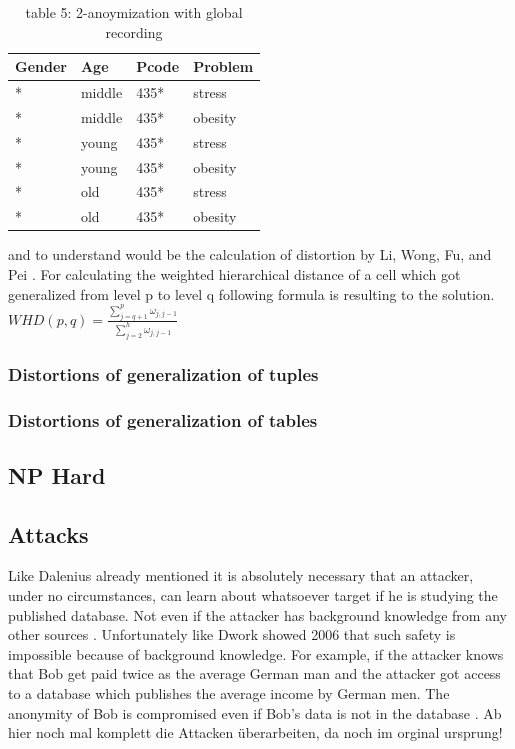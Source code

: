 \documentclass{llncs}
\begin{document}
\begin{table}[]
	\centering
	\caption{table 5: 2-anoymization with global recording}
	\label{table4}
	\begin{tabular}{@{}llll@{}}
		\toprule
		Gender & Age    & Pcode & Problem \\ \midrule
		*      & middle & 435*  & stress  \\
		*      & middle & 435*  & obesity \\
		*      & young  & 435*  & stress  \\
		*      & young  & 435*  & obesity \\
		*      & old    & 435*  & stress  \\
		*      & old    & 435*  & obesity
	\end{tabular}
\end{table} 
and to understand would be the calculation of distortion by Li, Wong, Fu, and Pei \cite{li2006achieving}. 
For calculating the weighted hierarchical distance of a cell which got generalized from level p to level q following formula is resulting to the solution.\\
$ WHD (p, q) = \frac{\sum_{j=q+1}^{p} \omega_{j,j-1}}{\sum_{j=2}^{h} \omega_{j,j-1}} $
\subsubsection{Distortions of generalization of tuples}
\subsubsection{Distortions of generalization of tables}

\subsection{NP Hard}

\subsection{Attacks}

Like Dalenius already mentioned it is absolutely necessary that an attacker, under no circumstances, can learn about whatsoever target if he is studying the published database. Not even if the attacker has background knowledge from any other sources  \cite{Dalenius1977}. Unfortunately like Dwork showed 2006 that such safety is impossible because of background knowledge. For example, if the attacker knows that Bob get paid twice as the average German man and the attacker got access to a database which publishes the average income by German men. The anonymity of Bob is compromised even if Bob's data is not in the database \cite{dwork2011differential}.  
Ab hier noch mal komplett die Attacken überarbeiten, da noch im orginal ursprung!
\end{document}
